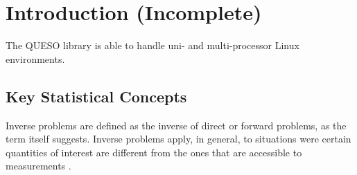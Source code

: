 \chapter{Introduction (Incomplete)}\label{ch-introduction}
\thispagestyle{headings}


The QUESO library is able to handle uni- and multi-processor Linux
environments.


\section{Key Statistical Concepts}


Inverse problems are defined as the inverse of direct or forward problems, as the term itself suggests.
Inverse problems apply, in general, to situations were certain quantities of interest are different from the ones that are accessible to measurements \cite{Andersen2001}. 



